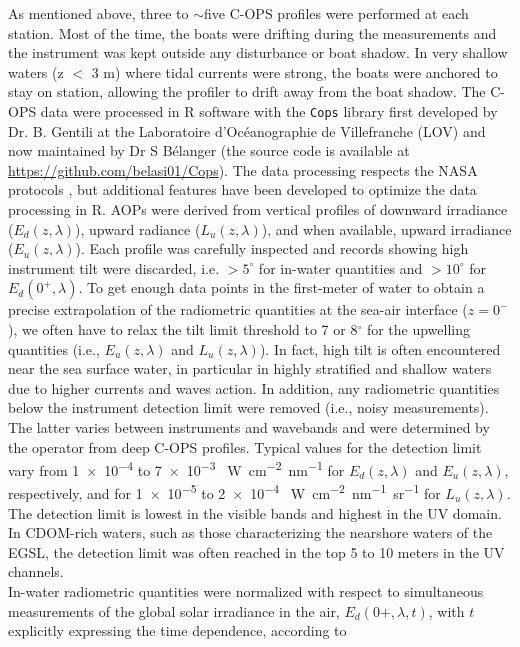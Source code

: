 \documentclass[essd, manuscript]{copernicus}
\begin{document}
As mentioned above, three to $\sim$five C-OPS profiles were performed at each station. Most of the time, the boats were drifting during the measurements and the instrument was kept outside any disturbance or boat shadow. In very shallow waters (z $<$ 3 m) where tidal currents were strong, the boats were anchored to stay on station, allowing the profiler to drift away from the boat shadow. The C-OPS data were processed in R software with the \texttt{Cops} library first developed by Dr. B. Gentili at the Laboratoire d'Océanographie de Villefranche (LOV) and now maintained by Dr S Bélanger (the source code is available at \url{https://github.com/belasi01/Cops}). The data processing respects the NASA protocols \citep{Mueller2003}, but additional features have been developed to optimize the data processing in R. AOPs were derived from vertical profiles of downward irradiance ($E_d(z,\lambda)$), upward radiance ($L_u(z,\lambda)$), and when available, upward irradiance ($E_u(z,\lambda)$). Each profile was carefully inspected and records showing high instrument tilt were discarded, i.e. $> 5^{\circ}$ for in-water quantities and $> 10^{\circ}$ for $E_d(0^+,\lambda)$. To get enough data points in the first-meter of water to obtain a precise extrapolation of the radiometric quantities at the sea-air interface ($z=0^-$), we often have to relax the tilt limit threshold to 7 or 8$^{\circ}$ for the upwelling quantities (i.e., $E_u(z,\lambda)$ and $L_u(z,\lambda)$). In fact, high tilt is often encountered near the sea surface water, in particular in highly stratified and shallow waters due to higher currents and waves action. In addition, any radiometric quantities below the instrument detection limit were removed (i.e., noisy measurements). The latter varies between instruments and wavebands and were determined by the operator from deep C-OPS profiles. Typical values for the detection limit vary from \num{1e-4} to \num{7e-3} \si{\micro.W.cm^{-2}.nm^{-1}} for $E_d(z,\lambda)$ and $E_u(z,\lambda)$, respectively, and for \num{1e-5} to \num{2e-4} \si{\micro.W.cm^{-2}.nm^{-1}.sr^{-1}} for $L_u(z,\lambda)$. The detection limit is lowest in the visible bands and highest in the UV domain. In CDOM-rich waters, such as those characterizing the nearshore waters of the EGSL, the detection limit was often reached in the top 5 to 10 meters in the UV channels.\\ 

In-water radiometric quantities were normalized with respect to simultaneous measurements of the global solar irradiance in the air, $E_d(0+,\lambda,t)$, with $t$ explicitly expressing the time dependence, according to
\end{document}
